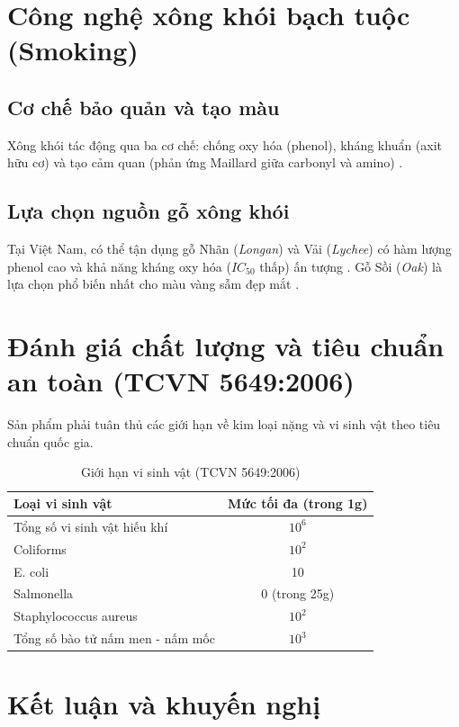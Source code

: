 \documentclass[12pt,a4paper]{report}
\begin{document}
\section{Công nghệ xông khói bạch tuộc (Smoking)}

\subsection{Cơ chế bảo quản và tạo màu}

Xông khói tác động qua ba cơ chế: chống oxy hóa (phenol), kháng khuẩn (axit hữu cơ) và tạo cảm quan (phản ứng Maillard giữa carbonyl và amino) \cite{smoke_antioxidant, hun_khoi_ky_thuat}.

\subsection{Lựa chọn nguồn gỗ xông khói}

Tại Việt Nam, có thể tận dụng gỗ Nhãn (\textit{Longan}) và Vải (\textit{Lychee}) có hàm lượng phenol cao và khả năng kháng oxy hóa ($IC_{50}$ thấp) ấn tượng \cite{lychee_pulp}. Gỗ Sồi (\textit{Oak}) là lựa chọn phổ biến nhất cho màu vàng sẫm đẹp mắt \cite{go_soi_xong_khoi}.

\section{Đánh giá chất lượng và tiêu chuẩn an toàn (TCVN 5649:2006)}

Sản phẩm phải tuân thủ các giới hạn về kim loại nặng và vi sinh vật theo tiêu chuẩn quốc gia.

\begin{table}[H]
\centering
\caption{Giới hạn vi sinh vật (TCVN 5649:2006)}
\begin{tabular}{lc}
\toprule
\textbf{Loại vi sinh vật} & \textbf{Mức tối đa (trong 1g)} \\
\midrule
Tổng số vi sinh vật hiếu khí & $10^6$ \\
Coliforms & $10^2$ \\
E. coli & 10 \\
Salmonella & 0 (trong 25g) \\
Staphylococcus aureus & $10^2$ \\
Tổng số bào tử nấm men - nấm mốc & $10^3$ \\
\bottomrule
\end{tabular}
\end{table}

\section{Kết luận và khuyến nghị}
\end{document}
